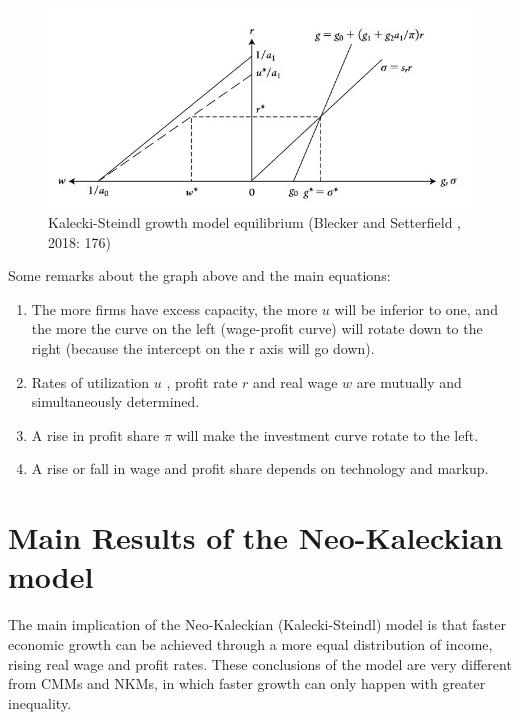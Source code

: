 \documentclass[
  letterpaper,
  DIV=11,
  numbers=noendperiod]{scrreprt}
\providecommand{\tightlist}{%
  \setlength{\itemsep}{0pt}\setlength{\parskip}{0pt}}\usepackage{longtable,booktabs,array}
\begin{document}
\begin{figure}

{\centering \includegraphics[width=6.32292in,height=\textheight]{images/kalecki-steindl1.jpg}

}

\caption{Kalecki-Steindl growth model equilibrium (Blecker and
Setterfield , 2018: 176)}

\end{figure}

Some remarks about the graph above and the main equations:

\begin{enumerate}
\def\labelenumi{\arabic{enumi}.}
\tightlist
\item
  The more firms have excess capacity, the more \(u\) will be inferior
  to one, and the more the curve on the left (wage-profit curve) will
  rotate down to the right (because the intercept on the r axis will go
  down).
\item
  Rates of utilization \(u\) , profit rate \(r\) and real wage \(w\) are
  mutually and simultaneously determined.
\item
  A rise in profit share \(\pi\) will make the investment curve rotate
  to the left.
\item
  A rise or fall in wage and profit share depends on technology and
  markup.
\end{enumerate}

\hypertarget{main-results-of-the-neo-kaleckian-model}{%
\section{Main Results of the Neo-Kaleckian
model}\label{main-results-of-the-neo-kaleckian-model}}

The main implication of the Neo-Kaleckian (Kalecki-Steindl) model is
that faster economic growth can be achieved through a more equal
distribution of income, rising real wage and profit rates. These
conclusions of the model are very different from CMMs and NKMs, in which
faster growth can only happen with greater inequality.
\end{document}
